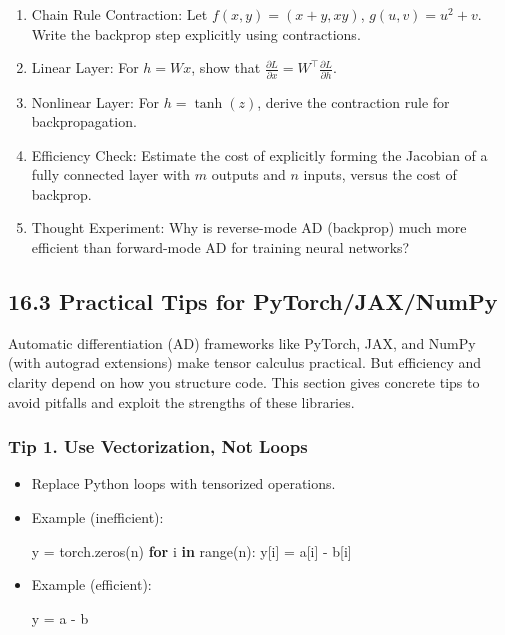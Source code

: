 \documentclass[
  letterpaper,
  DIV=11,
  numbers=noendperiod]{scrreprt}
\newenvironment{Shaded}{\begin{snugshade}}{\end{snugshade}}
\newcommand{\BuiltInTok}[1]{\textcolor[rgb]{0.00,0.23,0.31}{#1}}
\newcommand{\ControlFlowTok}[1]{\textcolor[rgb]{0.00,0.23,0.31}{\textbf{#1}}}
\newcommand{\KeywordTok}[1]{\textcolor[rgb]{0.00,0.23,0.31}{\textbf{#1}}}
\newcommand{\NormalTok}[1]{\textcolor[rgb]{0.00,0.23,0.31}{#1}}
\newcommand{\OperatorTok}[1]{\textcolor[rgb]{0.37,0.37,0.37}{#1}}
\begin{document}
\begin{enumerate}
\def\labelenumi{\arabic{enumi}.}
\item
  Chain Rule Contraction: Let \(f(x,y) = (x+y, xy)\),
  \(g(u,v) = u^2+v\). Write the backprop step explicitly using
  contractions.
\item
  Linear Layer: For \(h = Wx\), show that
  \(\frac{\partial L}{\partial x} = W^\top \frac{\partial L}{\partial h}\).
\item
  Nonlinear Layer: For \(h = \tanh(z)\), derive the contraction rule for
  backpropagation.
\item
  Efficiency Check: Estimate the cost of explicitly forming the Jacobian
  of a fully connected layer with \(m\) outputs and \(n\) inputs, versus
  the cost of backprop.
\item
  Thought Experiment: Why is reverse-mode AD (backprop) much more
  efficient than forward-mode AD for training neural networks?
\end{enumerate}

\subsection{16.3 Practical Tips for
PyTorch/JAX/NumPy}\label{practical-tips-for-pytorchjaxnumpy}

Automatic differentiation (AD) frameworks like PyTorch, JAX, and NumPy
(with autograd extensions) make tensor calculus practical. But
efficiency and clarity depend on how you structure code. This section
gives concrete tips to avoid pitfalls and exploit the strengths of these
libraries.

\subsubsection{Tip 1. Use Vectorization, Not
Loops}\label{tip-1.-use-vectorization-not-loops}

\begin{itemize}
\item
  Replace Python loops with tensorized operations.
\item
  Example (inefficient):

\begin{Shaded}
\begin{Highlighting}[]
\NormalTok{y }\OperatorTok{=}\NormalTok{ torch.zeros(n)}
\ControlFlowTok{for}\NormalTok{ i }\KeywordTok{in} \BuiltInTok{range}\NormalTok{(n):}
\NormalTok{    y[i] }\OperatorTok{=}\NormalTok{ a[i] }\OperatorTok{{-}}\NormalTok{ b[i]}
\end{Highlighting}
\end{Shaded}
\item
  Example (efficient):

\begin{Shaded}
\begin{Highlighting}[]
\NormalTok{y }\OperatorTok{=}\NormalTok{ a }\OperatorTok{{-}}\NormalTok{ b}
\end{Highlighting}
\end{Shaded}
\end{itemize}
\end{document}
